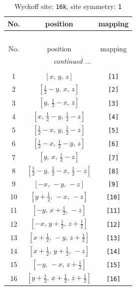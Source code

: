 \documentclass[fleqn,8pt]{jsarticle}
\begin{document}
\begin{longtable}{ccc}
\caption{Wyckoff site: {\tt 16k}, site symmetry: {\tt 1}}
 \\
 \hline \hline
No. & position & mapping \\ \hline \endfirsthead

\multicolumn{2}{l}{\tablename\ \thetable{}} \\
 \hline \hline
No. & position & mapping \\ \hline \endhead

 \hline \hline
\multicolumn{2}{r}{\footnotesize\it continued ...} \\ \endfoot

 \hline \hline
\multicolumn{2}{r}{} \\ \endlastfoot

1 & $\left[ x,\, y,\, z \right]$ & {\tt [1]} \\ \hline
2 & $\left[ \frac{1}{2} - y,\, x,\, z \right]$ & {\tt [2]} \\ \hline
3 & $\left[ y,\, \frac{1}{2} - x,\, z \right]$ & {\tt [3]} \\ \hline
4 & $\left[ x,\, \frac{1}{2} - y,\, \frac{1}{2} - z \right]$ & {\tt [4]} \\ \hline
5 & $\left[ \frac{1}{2} - x,\, y,\, \frac{1}{2} - z \right]$ & {\tt [5]} \\ \hline
6 & $\left[ \frac{1}{2} - x,\, \frac{1}{2} - y,\, z \right]$ & {\tt [6]} \\ \hline
7 & $\left[ y,\, x,\, \frac{1}{2} - z \right]$ & {\tt [7]} \\ \hline
8 & $\left[ \frac{1}{2} - y,\, \frac{1}{2} - x,\, \frac{1}{2} - z \right]$ & {\tt [8]} \\ \hline
9 & $\left[ - x,\, - y,\, - z \right]$ & {\tt [9]} \\ \hline
10 & $\left[ y + \frac{1}{2},\, - x,\, - z \right]$ & {\tt [10]} \\ \hline
11 & $\left[ - y,\, x + \frac{1}{2},\, - z \right]$ & {\tt [11]} \\ \hline
12 & $\left[ - x,\, y + \frac{1}{2},\, z + \frac{1}{2} \right]$ & {\tt [12]} \\ \hline
13 & $\left[ x + \frac{1}{2},\, - y,\, z + \frac{1}{2} \right]$ & {\tt [13]} \\ \hline
14 & $\left[ x + \frac{1}{2},\, y + \frac{1}{2},\, - z \right]$ & {\tt [14]} \\ \hline
15 & $\left[ - y,\, - x,\, z + \frac{1}{2} \right]$ & {\tt [15]} \\ \hline
16 & $\left[ y + \frac{1}{2},\, x + \frac{1}{2},\, z + \frac{1}{2} \right]$ & {\tt [16]} \\
\end{longtable}
\end{document}
